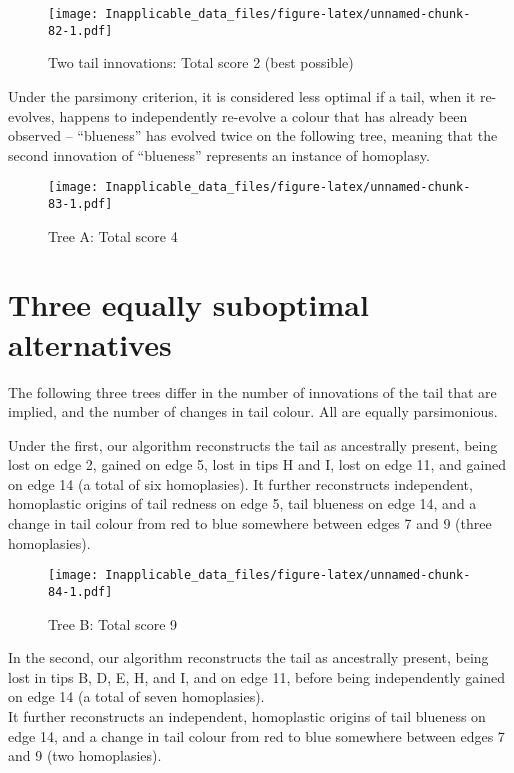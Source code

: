 \documentclass[]{book}
\theoremstyle{definition}
\theoremstyle{definition}
\theoremstyle{definition}
\theoremstyle{remark}
\begin{document}
\begin{figure}
\centering
\texttt{[image: Inapplicable\_data\_files/figure-latex/unnamed-chunk-82-1.pdf]}
\caption{\label{fig:unnamed-chunk-82}Two tail innovations: Total score 2
(best possible)}
\end{figure}

Under the parsimony criterion, it is considered less optimal if a tail,
when it re-evolves, happens to independently re-evolve a colour that has
already been observed -- ``blueness'' has evolved twice on the following
tree, meaning that the second innovation of ``blueness'' represents an
instance of homoplasy.

\begin{figure}
\centering
\texttt{[image: Inapplicable\_data\_files/figure-latex/unnamed-chunk-83-1.pdf]}
\caption{\label{fig:unnamed-chunk-83}Tree A: Total score 4}
\end{figure}

\section{Three equally suboptimal
alternatives}\label{three-equally-suboptimal-alternatives}

The following three trees differ in the number of innovations of the
tail that are implied, and the number of changes in tail colour. All are
equally parsimonious.

Under the first, our algorithm reconstructs the tail as ancestrally
present, being lost on edge 2, gained on edge 5, lost in tips H and I,
lost on edge 11, and gained on edge 14 (a total of six homoplasies). It
further reconstructs independent, homoplastic origins of tail redness on
edge 5, tail blueness on edge 14, and a change in tail colour from red
to blue somewhere between edges 7 and 9 (three homoplasies).

\begin{figure}
\centering
\texttt{[image: Inapplicable\_data\_files/figure-latex/unnamed-chunk-84-1.pdf]}
\caption{\label{fig:unnamed-chunk-84}Tree B: Total score 9}
\end{figure}

In the second, our algorithm reconstructs the tail as ancestrally
present, being lost in tips B, D, E, H, and I, and on edge 11, before
being independently gained on edge 14 (a total of seven homoplasies).\\
It further reconstructs an independent, homoplastic origins of tail
blueness on edge 14, and a change in tail colour from red to blue
somewhere between edges 7 and 9 (two homoplasies).
\end{document}
